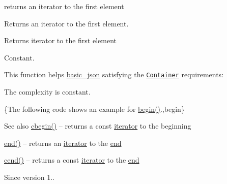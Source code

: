 returns an iterator to the first element 

Returns an iterator to the first element.

 \begin{DoxyReturn}{Returns}
iterator to the first element
\end{DoxyReturn}
Constant.

This function helps {\ttfamily \hyperlink{classnlohmann_1_1basic__json}{basic\+\_\+json}} satisfying the \href{https://en.cppreference.com/w/cpp/named_req/Container}{\tt Container} requirements\+:
\begin{DoxyItemize}
\item The complexity is constant.
\end{DoxyItemize}

\{The following code shows an example for {\ttfamily \hyperlink{classnlohmann_1_1basic__json_a0ff28dac23f2bdecee9564d07f51dcdc}{begin()}}.,begin\}

\begin{DoxySeeAlso}{See also}
\hyperlink{classnlohmann_1_1basic__json_ad865d6c291b237ae508d5cb2146b5877}{cbegin()} -- returns a const \hyperlink{classnlohmann_1_1basic__json_a099316232c76c034030a38faa6e34dca}{iterator} to the beginning 

\hyperlink{classnlohmann_1_1basic__json_a13e032a02a7fd8a93fdddc2fcbc4763c}{end()} -- returns an \hyperlink{classnlohmann_1_1basic__json_a099316232c76c034030a38faa6e34dca}{iterator} to the \hyperlink{classnlohmann_1_1basic__json_a13e032a02a7fd8a93fdddc2fcbc4763c}{end} 

\hyperlink{classnlohmann_1_1basic__json_a8dba7b7d2f38e6b0c614030aa43983f6}{cend()} -- returns a const \hyperlink{classnlohmann_1_1basic__json_a099316232c76c034030a38faa6e34dca}{iterator} to the \hyperlink{classnlohmann_1_1basic__json_a13e032a02a7fd8a93fdddc2fcbc4763c}{end}
\end{DoxySeeAlso}
\begin{DoxySince}{Since}
version 1.. 
\end{DoxySince}
